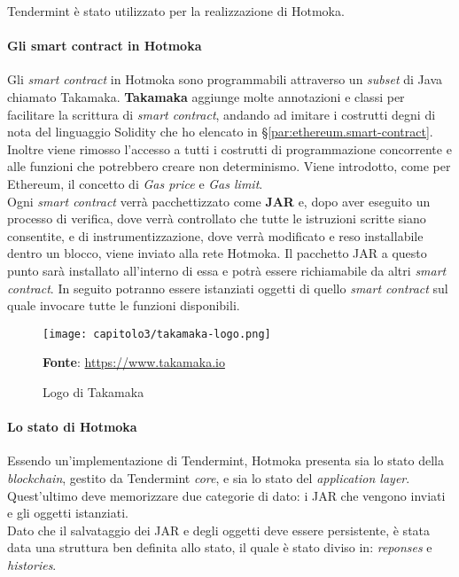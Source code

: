 \noindent Tendermint è stato utilizzato per la realizzazione di Hotmoka.

\paragraph{Gli smart contract in Hotmoka}
Gli \textit{smart contract} in Hotmoka sono programmabili attraverso un \textit{subset} di Java chiamato Takamaka. \textbf{Takamaka} aggiunge molte annotazioni e classi per facilitare la scrittura di \textit{smart contract}, andando ad imitare i costrutti degni di nota del linguaggio Solidity che ho elencato in §\ref{par:ethereum.smart-contract}. Inoltre viene rimosso l'accesso a tutti i costrutti di programmazione concorrente e alle funzioni che potrebbero creare non determinismo. Viene introdotto, come per Ethereum, il concetto di \textit{Gas price} e \textit{Gas limit}. \\

Ogni \textit{smart contract} verrà pacchettizzato come \textbf{JAR} e, dopo aver eseguito un processo di verifica, dove verrà controllato che tutte le istruzioni scritte siano consentite, e di instrumentizzazione, dove verrà modificato e reso installabile dentro un blocco, viene inviato alla rete Hotmoka.  
Il pacchetto JAR a questo punto sarà installato all'interno di essa e potrà essere richiamabile da altri \textit{smart contract}.
In seguito potranno essere istanziati oggetti di quello \textit{smart contract} sul quale invocare tutte le funzioni disponibili.

\begin{figure}[h!]
  \centering
  \texttt{[image: capitolo3/takamaka-logo.png]}
  \caption{Logo di Takamaka}
  \textbf{Fonte}: \href{https://www.takamaka.io}{https://www.takamaka.io}
\end{figure}

\paragraph{Lo stato di Hotmoka}
Essendo un'implementazione di Tendermint, Hotmoka presenta sia lo stato della \textit{blockchain}, gestito da Tendermint \textit{core}, e sia lo stato del \textit{application layer}. Quest'ultimo deve memorizzare due categorie di dato: i JAR che vengono inviati e gli oggetti istanziati. \\

Dato che il salvataggio dei JAR e degli oggetti deve essere persistente, è stata data una struttura ben definita allo stato, il quale è stato diviso in: \textit{reponses} e \textit{histories}.

